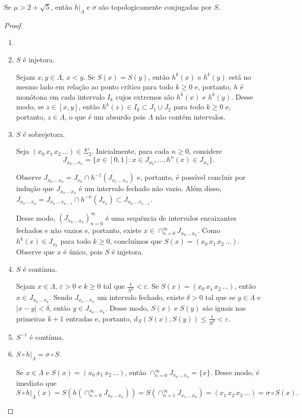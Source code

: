 \begin{proposition}
Se $\mu > 2 + \sqrt{5}$, então $h|_\Lambda$ e $\sigma$ são topologicamente conjugadas por $S$.
\end{proposition}

\begin{proof}
\begin{enumerate}[label=\alph*)]\item[]
\item $S$ é injetora.

Sejam $x, y \in \Lambda$, $x < y$. Se $S(x) = S(y)$, então $h^k(x)$ e $h^k(y)$ está no mesmo lado em relação ao ponto crítico para todo $k \geq 0$ e, portanto, $h$ é monótona em cada intervalo $I_k$ cujos extremos são $h^k(x)$ e $h^k(y)$. Desse modo, se $z \in [x, y]$, então $h^k(z) \in I_k \subset J_1 \cup J_2$ para todo $k \geq 0$ e, portanto, $z \in \Lambda$, o que é um absurdo pois $\Lambda$ não contém intervalos.

\item $S$ é sobrejetora.

Seja $(x_0 \, x_1 \, x_2 \, \dots) \in \Sigma_2$. Inicialmente, para cada $n \geq 0$, considere
$$J_{x_0 \, \dots \, x_n} = \lbrace x \in [0,1] : x \in J_{x_0}, \dots, h^n(x) \in J_{x_n} \rbrace.$$

Observe $J_{x_0 \, \dots \, x_n} = J_{x_0} \cap h^{-1}(J_{x_1 \, \dots \, x_n})$ e, portanto, é possível concluir por indução que $J_{x_0 \, \dots \, x_n}$ é um intervalo fechado não vazio. Além disso, $J_{x_0 \, \dots \, x_n} = J_{x_0 \, \dots \, x_{n-1}} \cap h^{-n}(J_{x_n}) \subset J_{x_0 \, \dots \, x_{n-1}}$.

Desse modo, $(J_{x_0 \, \dots \, x_n})_{n=0}^\infty$ é uma sequência de intervalos encaixantes fechados e não vazios e, portanto, existe $x \in \cap_{n=0}^\infty J_{x_0 \, \dots \, x_n}$. Como $h^k(x) \in J_{x_k}$ para todo $k \geq 0$, concluímos que $S(x) = (x_0 \, x_1 \, x_2 \, \dots)$. Observe que $x$ é único, pois $S$ é injetora.

\item $S$ é contínua.

Sejam $x \in \Lambda$, $\varepsilon > 0$ e $k \geq 0$ tal que $\frac{1}{N^k} < \varepsilon$. Se $S(x) = (x_0 \, x_1 \, x_2 \, \dots)$, então $x \in J_{x_0 \, \dots \, x_k}$. Sendo $J_{x_0 \, \dots \, x_k}$ um intervalo fechado, existe $\delta > 0$ tal que se $y \in \Lambda$ e $|x-y| < \delta$, então $y \in J_{x_0 \, \dots \, x_k}$. Desse modo, $S(x)$ e $S(y)$ são iguais nas primeiras $k+1$ entradas e, portanto, $d_N(S(x), S(y)) \leq \frac{1}{N^k} < \varepsilon$.

\item $S^{-1}$ é contínua.

\item $S \circ h|_\Lambda = \sigma \circ S$.

Se $x \in \Lambda$ e $S(x) = (x_0 \, x_1 \, x_2 \, \dots)$, então $\cap_{n=0}^\infty J_{x_0 \, \dots \, x_n} = \lbrace x \rbrace$. Desse modo, é imediato que
$$ S \circ h|_{\Lambda}(x) = S(h(\cap_{n=0}^\infty J_{x_0 \, \dots \, x_n})) = S(\cap_{n=1}^\infty J_{x_1 \, \dots \, x_n}) = (x_1 \, x_2 \, x_3 \, \dots)  = \sigma \circ S(x).$$
\end{enumerate}
\end{proof}
